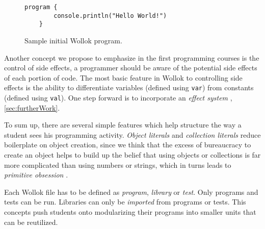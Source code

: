 \begin{figure}[h]
 \centering
 \begin{lstlisting}[language=Wollok]
	program {
		console.println("Hello World!")
	}
 \end{lstlisting}
 
 \caption{\small Sample initial Wollok program.}
 \label{fig:helloWorld/wollok}
\end{figure}

\medskip
Another concept we propose to emphasize in the first programming courses is the control of side effects, 
\ie a programmer should be aware of the potential side effects of each portion of code.
The most basic feature in Wollok to controlling side effects is the ability to 
differentiate variables (defined using \lstinline[language=Wollok]{var})
from constants (defined using \lstinline[language=Wollok]{val}).
One step forward is to incorporate an \emph{effect system} \cite{effect system}, \cf \ref{sec:furtherWork}.

\medskip
To sum up, there are several simple features which help structure the way a student sees his programming activity.
\emph{Object literals} and \emph{collection literals} reduce boilerplate on object creation, 
since we think that the excess of bureaucracy to create an object helps to build up 
the belief that using objects or collections is far more complicated than using numbers or strings, which in turns leads to \emph{primitive obsession} \cite{primitive obsession}.

Each Wollok file has to be defined as \emph{program}, \emph{library} or \emph{test}.
Only programs and tests can be run. Libraries can only be \emph{imported} from programs or tests.
This concepts push students onto modularizing their programs into smaller units that can be reutilized.
